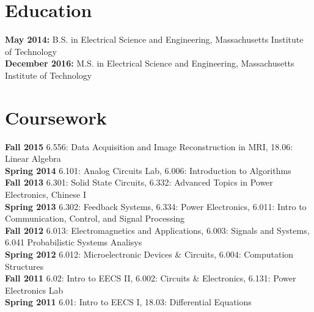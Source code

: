 \documentclass{res}
\begin{document}
 


\address{mspatz@mit.edu\\  }
\address{(816)-679-1502}

\begin{resume}
        
\section{Education}
\vspace{0.05in} 

{\bf May 2014:} B.S. in Electrical Science and Engineering, Massachusetts Institute of Technology\\
{\bf December 2016:} M.S. in Electrical Science and Engineering, Massachusetts Institute of Technology
\section{Coursework}
	\vspace{0.05in}
	{\bf Fall 2015} 6.556: Data Acquisition and Image Reconstruction in MRI, 18.06: Linear Algebra\vspace{0.05in}\\
    {\bf Spring 2014} 6.101: Analog Circuits Lab, 6.006: Introduction to Algorithms \vspace{0.05in}\\
    {\bf Fall 2013} 6.301: Solid State Circuits, 6.332: Advanced Topics in Power Electronics, Chinese I \vspace{0.05in}\\
    {\bf Spring 2013} 6.302: Feedback Systems, 6.334: Power Electronics, 6.011: Intro to Communication, Control, and Signal Processing \vspace{0.05in}\\
    {\bf Fall 2012} 6.013: Electromagnetics and Applications, 6.003: Signals and Systems, 6.041 Probabilistic Systems Analisys \vspace{0.05in}\\
    {\bf Spring 2012} 6.012: Microelectronic Devices \& Circuits, 6.004: Computation Structures \vspace{0.05in}\\
    {\bf Fall 2011}  6.02: Intro to EECS II, 6.002: Circuits \& Electronics, 6.131: Power Electronics Lab\vspace{0.05in}\\    
    {\bf Spring 2011} 6.01: Intro to EECS I, 18.03: Differential Equations

\end{resume}
\end{document}
